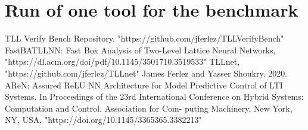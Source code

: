 \documentclass[12pt,a4paper]{report}
\theoremstyle{definition}
\theoremstyle{remark}
\begin{document}
\chapter{Run of one tool for the benchmark}
\begin{thebibliography}{1}
 TLL Verify Bench Repository, "https://github.com/jferlez/TLLVerifyBench"
 FastBATLLNN: Fast Box Analysis of Two-Level Lattice Neural Networks, "https://dl.acm.org/doi/pdf/10.1145/3501710.3519533"
 TLLnet, "https://github.com/jferlez/TLLnet"
 James Ferlez and Yasser Shoukry. 2020. AReN: Assured ReLU NN Architecture for
Model Predictive Control of LTI Systems. In Proceedings of the 23rd International
Conference on Hybrid Systems: Computation and Control. Association for Com-
puting Machinery, New York, NY, USA. "https://doi.org/10.1145/3365365.3382213"
\end{thebibliography}
\end{document}
